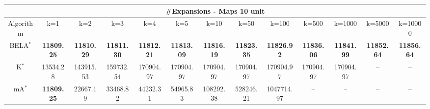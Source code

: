 \begin{tabular}{c|cccccccccccc}\toprule
\multicolumn{13}{c}{#Expansions - Maps 10 unit}\\ \midrule
Algorithm & k=1 & k=2 & k=3 & k=4 & k=5 & k=10 & k=50 & k=100 & k=500 & k=1000 & k=5000 & k=10000 \\ \midrule
BELA$^*$ & \textbf{11809.25} & \textbf{11810.29} & \textbf{11811.30} & \textbf{11812.21} & \textbf{11813.09} & \textbf{11816.19} & \textbf{11823.35} & \textbf{11826.92} & \textbf{11836.06} & \textbf{11841.99} & \textbf{11852.64} & \textbf{11856.64} \\
K$^*$ & 13534.28 & 143915.53 & 159732.54 & 170904.97 & 170904.97 & 170904.97 & 170904.97 & 170904.97 & 170904.97 & 170904.97 & -- & -- \\
mA$^*$ & \textbf{11809.25} & 22667.19 & 33468.82 & 44232.31 & 54965.83 & 108292.38 & 528246.21 & 1047714.97 & -- & -- & -- & -- \\ \bottomrule 
\end{tabular}
